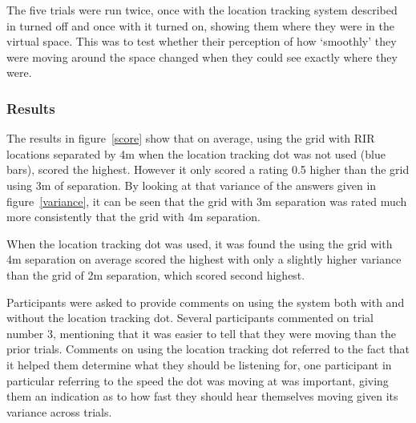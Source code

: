 \documentclass[../../main.tex]{subfiles}
\begin{document}
				The five trials were run twice, once with the location tracking system described in  turned off and once with it turned on, showing them where they were in the virtual space. This was to test whether their perception of how `smoothly' they were moving around the space changed when they could see exactly where they were.

			\subsubsection{Results}

				The results in figure~\ref{score} show that on average, using the grid with \ac{RIR} locations separated by 4m when the location tracking dot was not used (blue bars), scored the highest. However it only scored a rating 0.5 higher than the grid using 3m of separation. By looking at that variance of the answers given in figure~\ref{variance}, it can be seen that the grid with 3m separation was rated much more consistently that the grid with 4m separation.

				When the location tracking dot was used, it was found the using the grid with 4m separation on average scored the highest with only a slightly higher variance than the grid of 2m separation, which scored second highest.

				Participants were asked to provide comments on using the system both with and without the location tracking dot. Several participants commented on trial number 3, mentioning that it was easier to tell that they were moving than the prior trials. Comments on using the location tracking dot referred to the fact that it helped them determine what they should be listening for, one participant in particular referring to the speed the dot was moving at was important, giving them an indication as to how fast they should hear themselves moving given its variance across trials.

\end{document}
